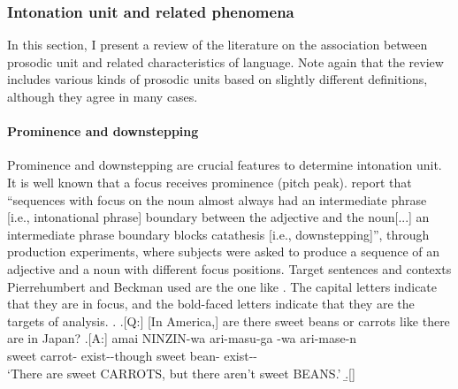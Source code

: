 

\subsubsection{Intonation unit and related phenomena}

In this section,
I present a review of the literature on the association between prosodic unit and related characteristics of language.
Note again that
the review includes various kinds of prosodic units
based on slightly different definitions,
although they agree in many cases.

\paragraph{Prominence and downstepping}

Prominence and downstepping are crucial features to determine intonation unit.
It is well known that
a focus receives prominence (pitch peak).
 report that
``sequences with focus on the noun almost always had an intermediate phrase [i.e., intonational phrase] boundary between the adjective and the noun[...] an intermediate phrase boundary blocks catathesis [i.e., downstepping]'',
through production experiments,
where subjects were asked to produce a sequence of an adjective and a noun with different focus positions.
Target sentences and contexts Pierrehumbert and Beckman used are the one like \Next.
The capital letters indicate that they are in focus, and
the bold-faced letters indicate that they are the targets of analysis.
%
%
\ex.
 \a.[Q:] [In America,] are there sweet beans or carrots like there are in Japan?
 \bg.[A:] amai {NINZIN}-wa ari-masu-ga  -wa ari-mase-n \\
          sweet carrot- exist--though sweet bean- exist-- \\
      `There are sweet CARROTS, but there aren't sweet BEANS.'
 \b.[]   \hfill{\cite[59]{pierrehumbertbeckman88}}

